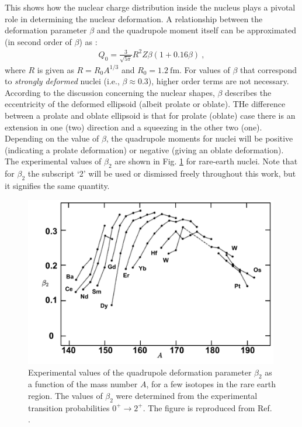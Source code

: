 This shows how the nuclear charge distribution inside the nucleus plays a pivotal role in determining the nuclear deformation. A relationship between the deformation parameter $\beta$ and the quadrupole moment itself can be approximated (in second order of $\beta$) as \cite{krane1991introductory}:
\begin{align}
    Q_0=\frac{3}{\sqrt{5\pi}}R^2Z\beta(1+0.16\beta)\ ,
    \label{quadrupole-moment-Q0}
\end{align}
where $R$ is given as $R=R_0A^{1/3}$ and $R_0=1.2\ \text{fm}$. For values of $\beta$ that correspond to \emph{strongly deformed} nuclei (i.e., $\beta\approx 0.3$), higher order terms are not necessary. According to the discussion concerning the nuclear shapes, $\beta$ describes the eccentricity of the deformed ellipsoid (albeit prolate or oblate). THe difference between a prolate and oblate ellipsoid is that for prolate (oblate) case there is an extension in one (two) direction and a squeezing in the other two (one). Depending on the value of $\beta$, the quadrupole moments for nuclei will be positive (indicating a prolate deformation) or negative (giving an oblate deformation). The experimental values of $\beta_2$ are shown in Fig. \ref{fig-quadrupole-beta-nuclides} for rare-earth nuclei. Note that for $\beta_2$ the subscript `2' will be used or dismissed freely throughout this work, but it signifies the same quantity. 
\begin{figure}
    \centering
    \includegraphics[width=0.99\textwidth]{Chapters/Figures/quadrupole_Deformation_rareEarth.pdf}
    \caption{Experimental values of the quadrupole deformation parameter $\beta_2$ as a function of the mass number $A$, for a few isotopes in the rare earth region. The values of $\beta_2$ were determined from the experimental transition probabilities $0^+\to 2^+$. The figure is reproduced from Ref. \cite{casten2000nuclear}.}
    \label{fig-quadrupole-beta-nuclides}
\end{figure}

